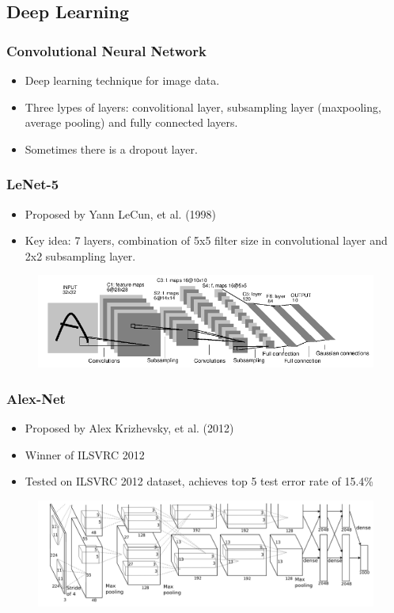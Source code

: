 \documentclass{beamer}
\begin{document}
\subsection{Deep Learning}
\begin{frame}\frametitle{Convolutional Neural Network}
\begin{itemize}
\item Deep learning technique for image data. 
\item Three lypes of layers: convolitional layer, subsampling layer (maxpooling, average pooling) and fully connected layers.
\item Sometimes there is a dropout layer.
\end{itemize} 
\end{frame}
\begin{frame}\frametitle{LeNet-5}
\begin{itemize}
	\item Proposed by Yann LeCun, et al. (1998)
	\item Key idea: 7 layers, combination of 5x5 filter size in convolutional layer and 2x2 subsampling layer. 
\end{itemize}
\begin{figure}[h]
	\includegraphics[scale=0.4]{figures/lenet5}
	\centering
	\label{fig:lenet5}
\end{figure}

\end{frame}
\begin{frame}\frametitle{Alex-Net}
\begin{itemize}
	\item Proposed by Alex Krizhevsky, et al. (2012)
	\item Winner of ILSVRC 2012
	\item Tested on ILSVRC 2012 dataset, achieves top 5 test error rate of 15.4\%
\end{itemize}
\begin{figure}[h]
	\includegraphics[scale=0.15]{figures/alexnet}
	\centering
	\label{fig:alexnet}
\end{figure}
\end{frame}
\end{document}
